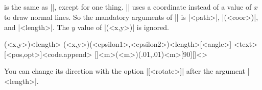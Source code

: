 \subsection{\protect\cmd{\tznormal}}
\label{ss:tznormal}

\icmd{\tznormal} is the same as |\tznormalat|, except for one thing.
|\tznormal| uses a coordinate instead of a value of $x$ to draw normal lines.
So the mandatory arguments of |\tznormal| is |{<path>}|, |(<coor>)|, and |{<length>}|. The $y$ value of |(<x,y>)| is ignored.

\begin{tzdef}
(<x,y>){<length>}
(<x,y>)(<epsilon1>,<epsilon2>){<length>}[<angle>]
        {<text>}[<pos,opt>]<code.append>
  []{<m>}(<m>)(.01,.01){<m>}[90]{}[]<>
\end{tzdef}



\begin{tzcode}{.3}
{}
\end{tzcode}

You can change its direction with the option |[<rotate>]| after the argument |{<length>}|.

\begin{tzcode}{.3}
\end{tzcode}


\subsection{\protect{}}
\label{ss:tznormal'}

